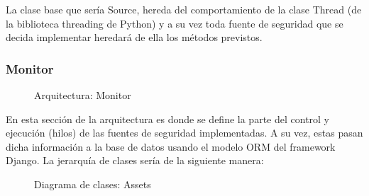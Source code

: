 La clase base que sería Source, hereda del comportamiento de la clase Thread (de la biblioteca threading de Python) y a su vez toda fuente de seguridad que se decida implementar heredará de ella los métodos previstos.\\
\newpage

\subsubsection{Monitor}

\begin{figure}[H]
  \caption{Arquitectura: Monitor}
\end{figure}

En esta sección de la arquitectura es donde se define la parte del control y ejecución (hilos) de las fuentes de seguridad implementadas. A su vez, estas pasan dicha información a la base de datos usando el modelo ORM del framework Django. La jerarquía de clases sería de la siguiente manera: \\

\begin{figure}[H]
  \caption{Diagrama de clases: Assets}
\end{figure}

